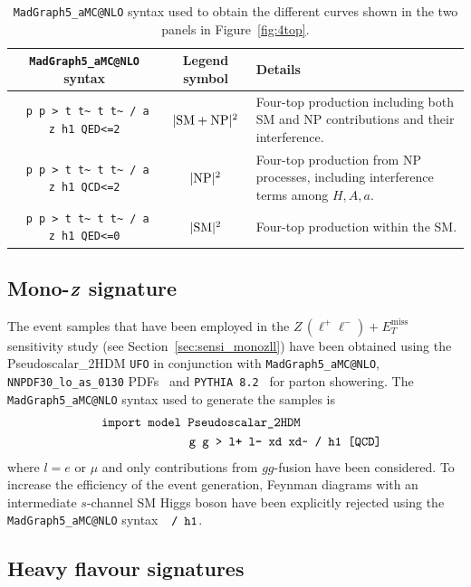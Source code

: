 \documentclass[a4paper, 11pt,notoc]{article}
\newcommand{\MET}{\ensuremath{E_T^\mathrm{miss}}\xspace}
\def\bm#1{\mbox{\boldmath$#1$\unboldmath}}
\begin{document}
\begin{table}[t!]
\begin{tabular}{ccm{50mm}}
\toprule
 {\tt MadGraph5\_aMC@NLO} syntax & Legend symbol & Details \\\midrule
\verb| p p > t t~ t t~ / a z h1 QED<=2|& $|{\rm SM}+{\rm NP}|^2$ & Four-top
production including both SM and NP contributions and their
interference. \\\midrule
\verb| p p > t t~ t t~ / a z h1 QCD<=2|& $|{\rm NP}|^2$ & Four-top
production from NP processes, including interference terms among
$H,A,a$. \\\midrule
\verb| p p > t t~ t t~ / a z h1 QED<=0|& $|{\rm SM}|^2$ & Four-top 
production within the SM.\\
\bottomrule
\end{tabular}
\vspace{4mm} 
\caption{{\tt MadGraph5\_aMC@NLO} syntax used to obtain the different curves shown in the two panels in Figure~\ref{fig:4top}.}
\label{tab-dmhf-4tops}
\end{table}

\subsection*{Mono-$\bm{Z}$ signature}

The event samples that have been employed in the $Z \, (\ell^+ \ell^-) + \MET$ sensitivity study (see Section~\ref{sec:sensi_monozll}) have been obtained using the Pseudoscalar\_2HDM {\tt UFO} in conjunction with {\tt MadGraph5\_aMC@NLO}, {\tt NNPDF30\_lo\_as\_0130} PDFs~\cite{Ball:2014uwa} and  {\tt PYTHIA~8.2}~\cite{Sjostrand:2014zea} for parton showering.  The {\tt MadGraph5\_aMC@NLO}  syntax used to generate the samples is 
\begin{eqnarray}
&& \verb| import model Pseudoscalar_2HDM | \hspace{2.25cm} \nonumber \\
&& \verb| g g > l+ l- xd xd~ / h1 [QCD] | \nonumber 
\end{eqnarray}
where $l = e$ or $\mu$ and only contributions from $gg$-fusion have been considered.  To increase the efficiency of the event generation, Feynman diagrams with an intermediate $s$-channel SM Higgs boson have been explicitly rejected using the  {\tt MadGraph5\_aMC@NLO} syntax~~$\verb|/ h1|$.

\subsection*{Heavy flavour signatures}
\end{document}
